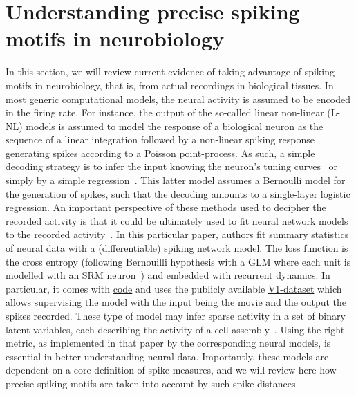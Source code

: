 \documentclass[brainsci, %
               review,submit,pdftex,moreauthors
               ]{Definitions/mdpi}
\begin{document}
\section{Understanding precise spiking motifs in neurobiology}
In this section, we will review current evidence of taking advantage of spiking motifs in neurobiology, that is, from actual recordings in biological tissues. In most generic computational models, the neural activity is assumed to be encoded in the firing rate. For instance, the output of the so-called linear non-linear (L-NL) models is assumed to model the response of a biological neuron as the sequence of a linear integration followed by a non-linear spiking response generating spikes according to a Poisson point-process. As such, a simple decoding strategy is to infer the input knowing the neuron's tuning curves~\citep{jazayeri_optimal_2006} or simply by a simple regression~\citep{berens_fast_2012}. This latter model assumes a Bernoulli model for the generation of spikes, such that the decoding amounts to a single-layer logistic regression. An important perspective of these methods used to decipher the recorded activity is that it could be ultimately used to fit neural network models to the recorded activity~\citep{bellec_fitting_2021}. In this particular paper, authors fit summary statistics of neural data with a (differentiable) spiking network model. The loss function is the cross entropy (following Bernouilli hypothesis with a GLM where each unit is modelled with an SRM neuron~\citep{gerstner_time_1995}) and embedded with recurrent dynamics. In particular, it comes with \href{https://github.com/EPFL-LCN/pub-bellec-wang-2021-sample-and-measure}{code} and uses the publicly available \href{http://crcns.org/data-sets/vc/pvc-11}{V1-dataset} which allows supervising the model with the input being the movie and the output the spikes recorded. These type of model may infer sparse activity in a set of binary latent variables, each describing the activity of a cell assembly~\citep{warner_probabilistic_2022}.
Using the right metric, as implemented in that paper by the corresponding neural models, is essential in better understanding neural data. Importantly, these models are dependent on a core definition of spike measures, and we will review here how precise spiking motifs are taken into account by such spike distances.
%
\end{document}
